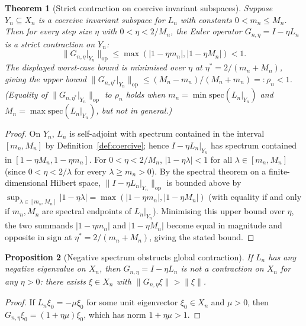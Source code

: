 \documentclass[11pt, a4paper]{amsart}
\newtheorem{theorem}{Theorem}[section]
\newtheorem{proposition}[theorem]{Proposition}
\theoremstyle{definition}
\newcommand{\op}{\operatorname{op}}
\begin{document}
\begin{theorem}[Strict contraction on coercive invariant subspaces]
\label{thm:coercive-contraction}
Suppose $Y_n \subseteq X_n$ is a coercive invariant subspace for
$L_n$ with constants $0 < m_n \leq M_n$. Then for every step size
$\eta$ with $0 < \eta < 2/M_n$, the Euler operator $G_{n, \eta} =
I - \eta L_n$ is a strict contraction on $Y_n$:
\[
  \|G_{n, \eta}|_{Y_n}\|_{\op} \leq \max(|1 - \eta m_n|, |1 - \eta
    M_n|) < 1.
\]
The displayed worst-case bound is minimised over $\eta$ at
$\eta^* = 2/(m_n + M_n)$, giving the upper bound
$\|G_{n, \eta^*}|_{Y_n}\|_{\op} \leq (M_n - m_n)/(M_n + m_n)
=: \rho_n < 1$. (Equality of $\|G_{n, \eta^*}|_{Y_n}\|_{\op}$
to $\rho_n$ holds when $m_n = \min \mathrm{spec}(L_n|_{Y_n})$ and
$M_n = \max \mathrm{spec}(L_n|_{Y_n})$, but not in general.)
\end{theorem}

\begin{proof}
On $Y_n$, $L_n$ is self-adjoint with spectrum contained in the
interval $[m_n, M_n]$ by Definition~\ref{def:coercive}; hence
$I - \eta L_n|_{Y_n}$ has spectrum contained in
$[1 - \eta M_n, 1 - \eta m_n]$. For $0 < \eta < 2/M_n$,
$|1 - \eta \lambda| < 1$ for all $\lambda \in [m_n, M_n]$
(since $0 < \eta < 2/\lambda$ for every $\lambda \geq m_n > 0$).
By the spectral theorem on a finite-dimensional Hilbert space,
$\|I - \eta L_n|_{Y_n}\|_{\op}$ is bounded above by
$\sup_{\lambda \in [m_n, M_n]} |1 - \eta \lambda|
= \max(|1 - \eta m_n|, |1 - \eta M_n|)$ (with equality if and
only if $m_n, M_n$ are spectral endpoints of $L_n|_{Y_n}$).
Minimising this upper bound over $\eta$, the two summands
$|1 - \eta m_n|$ and $|1 - \eta M_n|$ become equal in magnitude
and opposite in sign at $\eta^* = 2/(m_n + M_n)$, giving the
stated bound.
\end{proof}

\begin{proposition}[Negative spectrum obstructs global contraction]
\label{prop:no-global-contraction}
If $L_n$ has \emph{any} negative eigenvalue on $X_n$, then
$G_{n, \eta} = I - \eta L_n$ is \emph{not} a contraction on
$X_n$ for any $\eta > 0$: there exists $\xi \in X_n$ with
$\|G_{n, \eta} \xi\| > \|\xi\|$.
\end{proposition}

\begin{proof}
If $L_n \xi_0 = -\mu \xi_0$ for some unit eigenvector $\xi_0 \in
X_n$ and $\mu > 0$, then $G_{n, \eta} \xi_0 = (1 + \eta\mu)
\xi_0$, which has norm $1 + \eta\mu > 1$.
\end{proof}
\end{document}
